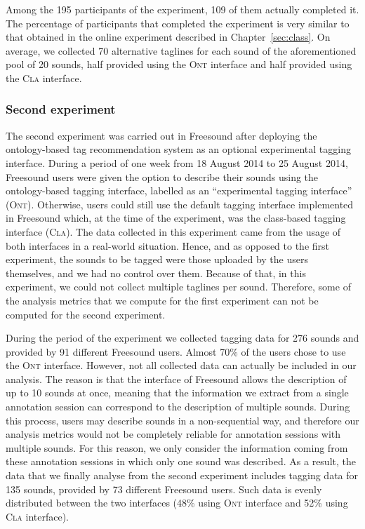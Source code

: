 Among the 195 participants of the experiment, 109 of them actually completed it.
The percentage of participants that completed the experiment is very similar to that obtained in the online experiment described in Chapter~\ref{sec:class}.
On average, we collected 70 alternative taglines for each sound of the aforementioned pool of 20 sounds, half provided using the \textsc{Ont} interface and half provided using the \textsc{Cla} interface.

\subsubsection{Second experiment}

The second experiment was carried out in Freesound after deploying the on\-to\-lo\-gy-based tag recommendation system as an optional experimental tagging interface. 
During a period of one week from 18 August 2014 to 25 August 2014, Freesound users were given the option to describe their sounds using the ontology-based tagging interface, labelled as an ``experimental tagging interface'' (\textsc{Ont}). Otherwise, users could still use the default tagging interface implemented in Freesound which, at the time of the experiment, was the class-based tagging interface (\textsc{Cla}).
The data collected in this experiment came from the usage of both interfaces in a real-world situation.
Hence, and as opposed to the first experiment, the sounds to be tagged were those uploaded by the users themselves, and we had no control over them.
Because of that, in this experiment, we could not collect multiple taglines per sound. Therefore, some of the analysis metrics that we compute for the first experiment can not be computed for the second experiment. 

During the period of the experiment we collected tagging data for 276 sounds and provided by 91 different Freesound users. 
Almost 70\% of the users chose to use the \textsc{Ont} interface. 
However, not all collected data can actually be included in our analysis.
The reason is that the interface of Freesound allows the description of up to 10 sounds at once, meaning that the information we extract from a single annotation session can correspond to the description of multiple sounds. 
During this process, users may describe sounds in a non-sequential way, and therefore our analysis metrics would not be completely reliable for annotation sessions with multiple sounds. 
For this reason, we only consider the information coming from these annotation sessions in which only one sound was described. As a result, the data that we finally analyse from the second experiment includes tagging data for 135 sounds, provided by 73 different Freesound users. Such data is evenly distributed between the two interfaces (48\% using \textsc{Ont} interface and 52\% using \textsc{Cla} interface).


